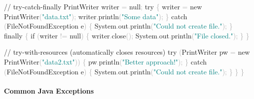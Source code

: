 \documentclass[
  justified,
  openright,
]{tufte-book}
\let\subsubsection\paragraph
\let\paragraph\paragraph
\newcommand{\BuiltInTok}[1]{#1}
\newcommand{\CommentTok}[1]{\textcolor{MidGray}{#1}}
\newcommand{\ControlFlowTok}[1]{\textcolor{BrandBlue}{#1}}
\newcommand{\FunctionTok}[1]{\textcolor{BrandBlue}{#1}}
\newcommand{\KeywordTok}[1]{\textcolor{BrandBlue}{#1}}
\newcommand{\NormalTok}[1]{#1}
\newcommand{\OperatorTok}[1]{\textcolor{DarkGray}{#1}}
\newcommand{\StringTok}[1]{\textcolor{Teal}{#1}}
\newenvironment{Shaded}{%
  \begin{snugshade}
}{%
  \end{snugshade}
}
\let\subsubsection\paragraph
\let\paragraph\paragraph
\begin{document}
\begin{Shaded}
\begin{Highlighting}[]
        \CommentTok{// try{-}catch{-}finally}
        \BuiltInTok{PrintWriter}\NormalTok{ writer }\OperatorTok{=} \KeywordTok{null}\OperatorTok{;}
        \ControlFlowTok{try} \OperatorTok{\{}
\NormalTok{            writer }\OperatorTok{=} \KeywordTok{new} \BuiltInTok{PrintWriter}\OperatorTok{(}\StringTok{"data.txt"}\OperatorTok{);}
\NormalTok{            writer}\OperatorTok{.}\FunctionTok{println}\OperatorTok{(}\StringTok{"Some data"}\OperatorTok{);}
        \OperatorTok{\}} \ControlFlowTok{catch} \OperatorTok{(}\BuiltInTok{FileNotFoundException}\NormalTok{ e}\OperatorTok{)} \OperatorTok{\{}
            \BuiltInTok{System}\OperatorTok{.}\FunctionTok{out}\OperatorTok{.}\FunctionTok{println}\OperatorTok{(}\StringTok{"Could not create file."}\OperatorTok{);}
        \OperatorTok{\}} \ControlFlowTok{finally} \OperatorTok{\{}
            \ControlFlowTok{if} \OperatorTok{(}\NormalTok{writer }\OperatorTok{!=} \KeywordTok{null}\OperatorTok{)} \OperatorTok{\{}
\NormalTok{                writer}\OperatorTok{.}\FunctionTok{close}\OperatorTok{();}
                \BuiltInTok{System}\OperatorTok{.}\FunctionTok{out}\OperatorTok{.}\FunctionTok{println}\OperatorTok{(}\StringTok{"File closed."}\OperatorTok{);}
            \OperatorTok{\}}
        \OperatorTok{\}}

        \CommentTok{// try{-}with{-}resources (automatically closes resources)}
        \ControlFlowTok{try} \OperatorTok{(}\BuiltInTok{PrintWriter}\NormalTok{ pw }\OperatorTok{=} \KeywordTok{new} \BuiltInTok{PrintWriter}\OperatorTok{(}\StringTok{"data2.txt"}\OperatorTok{))} \OperatorTok{\{}
\NormalTok{            pw}\OperatorTok{.}\FunctionTok{println}\OperatorTok{(}\StringTok{"Better approach!"}\OperatorTok{);}
        \OperatorTok{\}} \ControlFlowTok{catch} \OperatorTok{(}\BuiltInTok{FileNotFoundException}\NormalTok{ e}\OperatorTok{)} \OperatorTok{\{}
            \BuiltInTok{System}\OperatorTok{.}\FunctionTok{out}\OperatorTok{.}\FunctionTok{println}\OperatorTok{(}\StringTok{"Could not create file."}\OperatorTok{);}
        \OperatorTok{\}}
    \OperatorTok{\}}
\OperatorTok{\}}
\end{Highlighting}
\end{Shaded}

\subsubsection{Common Java Exceptions}\label{common-java-exceptions}
\end{document}
